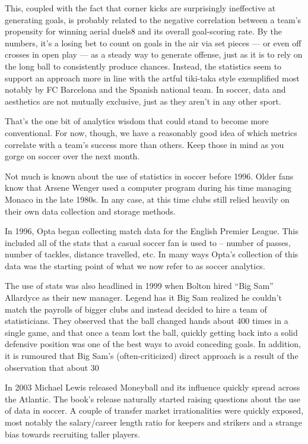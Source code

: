 This, coupled with the fact that corner kicks are surprisingly ineffective at generating goals, is probably related to the negative correlation between a team’s propensity for winning aerial duels8 and its overall goal-scoring rate. By the numbers, it’s a losing bet to count on goals in the air via set pieces — or even off crosses in open play — as a steady way to generate offense, just as it is to rely on the long ball to consistently produce chances. Instead, the statistics seem to support an approach more in line with the artful tiki-taka style exemplified most notably by FC Barcelona and the Spanish national team. In soccer, data and aesthetics are not mutually exclusive, just as they aren’t in any other sport.

That’s the one bit of analytics wisdom that could stand to become more conventional. For now, though, we have a reasonably good idea of which metrics correlate with a team’s success more than others. Keep those in mind as you gorge on soccer over the next month.

Not much is known about the use of statistics in soccer before 1996. Older fans know that Arsene Wenger used a computer program during his time managing Monaco in the late 1980s. In any case, at this time clubs still relied heavily on their own data collection and storage methods.

In 1996, Opta began collecting match data for the English Premier League. This included all of the stats that a casual soccer fan is used to – number of passes, number of tackles, distance travelled, etc. In many ways Opta’s collection of this data was the starting point of what we now refer to as soccer analytics.

The use of stats was also headlined in 1999 when Bolton hired “Big Sam” Allardyce as their new manager. Legend has it Big Sam realized he couldn’t match the payrolls of bigger clubs and instead decided to hire a team of statisticians. They observed that the ball changed hands about 400 times in a single game, and that once a team lost the ball, quickly getting back into a solid defensive position was one of the best ways to avoid conceding goals. In addition, it is rumoured that Big Sam’s (often-criticized) direct approach is a result of the observation that about 30%

In 2003 Michael Lewis released Moneyball and its influence quickly spread across the Atlantic. The book’s release naturally started raising questions about the use of data in soccer. A couple of transfer market irrationalities were quickly exposed, most notably the salary/career length ratio for keepers and strikers and a strange bias towards recruiting taller players.

